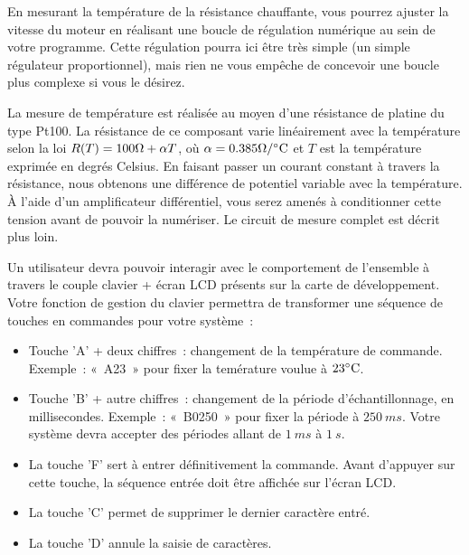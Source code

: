 \documentclass[11pt,a4paper]{article}
\theoremstyle{definition}%
\begin{document}
En mesurant la température de la résistance chauffante, vous pourrez ajuster la vitesse du moteur en réalisant une boucle de régulation numérique au sein de votre programme.
Cette régulation pourra ici être très simple (un simple régulateur proportionnel), mais rien ne vous empêche de concevoir une boucle plus complexe si vous le désirez.

\begin{center}
\end{center}

La mesure de température est réalisée au moyen d’une résistance de platine du type Pt100.
La résistance de ce composant varie linéairement avec la température selon la loi $R(T) = 100\ohm + \alpha T$, où $\alpha = 0.385\ohm/\celsius$ et $T$ est la température exprimée en degrés Celsius.
En faisant passer un courant constant à travers la résistance, nous obtenons une différence de potentiel variable avec la température.
À l’aide d’un amplificateur différentiel, vous serez amenés à conditionner cette tension avant de pouvoir la numériser.
Le circuit de mesure complet est décrit plus loin.

\begin{center}
\end{center}

Un utilisateur devra pouvoir interagir avec le comportement de l'ensemble à travers le couple clavier + écran LCD présents sur la carte de développement.
Votre fonction de gestion du clavier permettra de transformer une séquence de touches en commandes pour votre système~:
\begin{itemize}
	\item Touche 'A' + deux chiffres~: changement de la température de commande.
	Exemple~: «~A23~» pour fixer la temérature voulue à $23\celsius$.
	\item Touche 'B' + autre chiffres~: changement de la période d'échantillonnage, en millisecondes.
	Exemple~: «~B0250~» pour fixer la période à $250\ ms$.
	Votre système devra accepter des périodes allant de $1\ ms$ à $1\ s$.
	\item La touche 'F' sert à entrer définitivement la commande.
	Avant d'appuyer sur cette touche, la séquence entrée doit être affichée sur l'écran LCD.
	\item La touche 'C' permet de supprimer le dernier caractère entré.
	\item La touche 'D' annule la saisie de caractères.
\end{itemize}
\end{document}
